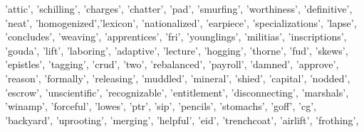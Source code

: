 \documentclass[12pt,]{book}
\newenvironment{Shaded}{\begin{snugshade}}{\end{snugshade}}
\newcommand{\StringTok}[1]{\textcolor[rgb]{0.31,0.60,0.02}{#1}}
\newcommand{\NormalTok}[1]{#1}
\begin{document}
\begin{Shaded}
\begin{Highlighting}[]
                \StringTok{'attic'}\NormalTok{, }\StringTok{'schilling'}\NormalTok{, }\StringTok{'charges'}\NormalTok{, }\StringTok{'chatter'}\NormalTok{, }\StringTok{'pad'}\NormalTok{, }\StringTok{'smurfing'}\NormalTok{,}
                \StringTok{'worthiness'}\NormalTok{, }\StringTok{'definitive'}\NormalTok{, }\StringTok{'neat'}\NormalTok{, }\StringTok{'homogenized'}\NormalTok{,}\StringTok{'lexicon'}\NormalTok{,}
                \StringTok{'nationalized'}\NormalTok{, }\StringTok{'earpiece'}\NormalTok{, }\StringTok{'specializations'}\NormalTok{, }\StringTok{'lapse'}\NormalTok{,}
                \StringTok{'concludes'}\NormalTok{, }\StringTok{'weaving'}\NormalTok{, }\StringTok{'apprentices'}\NormalTok{, }\StringTok{'fri'}\NormalTok{, }\StringTok{'younglings'}\NormalTok{,}
                \StringTok{'militias'}\NormalTok{, }\StringTok{'inscriptions'}\NormalTok{, }\StringTok{'gouda'}\NormalTok{, }\StringTok{'lift'}\NormalTok{, }\StringTok{'laboring'}\NormalTok{, }
                \StringTok{'adaptive'}\NormalTok{, }\StringTok{'lecture'}\NormalTok{, }\StringTok{'hogging'}\NormalTok{, }\StringTok{'thorne'}\NormalTok{, }\StringTok{'fud'}\NormalTok{, }\StringTok{'skews'}\NormalTok{,}
                \StringTok{'epistles'}\NormalTok{, }\StringTok{'tagging'}\NormalTok{, }\StringTok{'crud'}\NormalTok{, }\StringTok{'two'}\NormalTok{, }\StringTok{'rebalanced'}\NormalTok{, }\StringTok{'payroll'}\NormalTok{,}
                \StringTok{'damned'}\NormalTok{, }\StringTok{'approve'}\NormalTok{, }\StringTok{'reason'}\NormalTok{, }\StringTok{'formally'}\NormalTok{, }\StringTok{'releasing'}\NormalTok{, }\StringTok{'muddled'}\NormalTok{,}
                \StringTok{'mineral'}\NormalTok{, }\StringTok{'shied'}\NormalTok{, }\StringTok{'capital'}\NormalTok{, }\StringTok{'nodded'}\NormalTok{, }\StringTok{'escrow'}\NormalTok{, }\StringTok{'unscientific'}\NormalTok{,}
                \StringTok{'recognizable'}\NormalTok{, }\StringTok{'entitlement'}\NormalTok{, }\StringTok{'disconnecting'}\NormalTok{, }\StringTok{'marshals'}\NormalTok{,}
                \StringTok{'winamp'}\NormalTok{, }\StringTok{'forceful'}\NormalTok{, }\StringTok{'lowes'}\NormalTok{, }\StringTok{'ptr'}\NormalTok{, }\StringTok{'sip'}\NormalTok{, }\StringTok{'pencils'}\NormalTok{, }\StringTok{'stomachs'}\NormalTok{,}
                \StringTok{'goff'}\NormalTok{, }\StringTok{'cg'}\NormalTok{, }\StringTok{'backyard'}\NormalTok{, }\StringTok{'uprooting'}\NormalTok{, }\StringTok{'merging'}\NormalTok{,}
                \StringTok{'helpful'}\NormalTok{, }\StringTok{'eid'}\NormalTok{, }\StringTok{'trenchcoat'}\NormalTok{, }\StringTok{'airlift'}\NormalTok{, }\StringTok{'frothing'}\NormalTok{,}

\end{Highlighting}
\end{Shaded}
\end{document}
